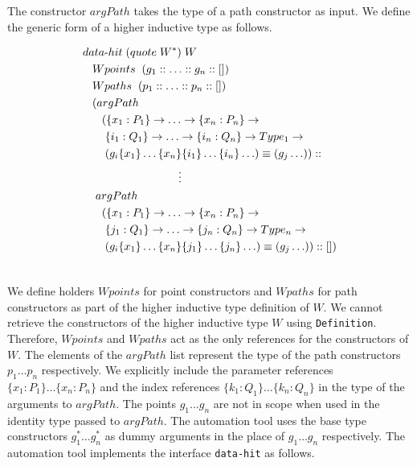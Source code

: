 \documentclass[sigplan,10pt]{acmart}
\begin{document}
The constructor $argPath$ takes the type of a path constructor as input. We define the generic form of a higher inductive type as follows.
\begin{center}
\begingroup
\fontsize{7.9pt}{0pt}\selectfont
\begin{align}
& data{\text -}hit \hspace {0.1cm} (quote \hspace {0.1cm} W^*) \hspace {0.1cm} W \nonumber \\
  & \hspace {0.3cm} Wpoints \hspace {0.2cm} (g_1 ::  \ldots :: g_n :: []) \nonumber \\
  & \hspace {0.3cm} Wpaths  \hspace {0.2cm} (p_1 :: \ldots :: p_n :: []) \nonumber \\
  & \hspace {0.3cm} (argPath \nonumber \\
  & \hspace {0.6cm} (\{x_1:P_1\} \rightarrow \ldots \rightarrow \{x_n:P_n\} \rightarrow \nonumber \\
  & \hspace {0.7cm} \{i_1:Q_1\} \rightarrow \ldots \rightarrow \{i_n:Q_n\} \rightarrow Type_1 \rightarrow \nonumber \\
  & \hspace {0.7cm} (g_i \{x_1\} \ldots \{x_n\} \{i_1\} \ldots \{i_n\} \ldots) \equiv (g_j \ldots)) :: \nonumber \\
  & \hspace {3cm} \vdots \nonumber \\
  & \hspace {0.4cm} argPath \nonumber \\
  & \hspace {0.6cm} (\{x_1:P_1\} \rightarrow \ldots \rightarrow \{x_n:P_n\} \rightarrow \nonumber \\
  & \hspace {0.7cm} \{j_1:Q_1\} \rightarrow \ldots \rightarrow \{j_n:Q_n\} \rightarrow Type_n \rightarrow \nonumber \\
  & \hspace {0.7cm} (g_i \{x_1\} \ldots \{x_n\} \{j_1\} \ldots \{j_n\} \ldots) \equiv (g_j \ldots)) :: [])\nonumber \\ \nonumber
\end{align}
\endgroup
\end{center}
\normalsize

We define holders $Wpoints$ for point constructors and $Wpaths$ for path constructors as part of the higher inductive type definition of $W$. We cannot retrieve the constructors of the higher inductive type $W$ using {\tt Definition}. Therefore, $Wpoints$ and $Wpaths$ act as the only references for the constructors of $W$. The elements of the $argPath$ list represent the type of the path constructors $p_1 \ldots p_n$ respectively. We explicitly include the parameter references $\{x_1 : P_1\} \ldots \{x_n : P_n\}$ and the index references $\{k_1 : Q_1\} \ldots \{k_n : Q_n\}$ in the type of the arguments to $argPath$. The points $g_1 \ldots g_n$ are not in scope when used in the identity type passed to $argPath$. The automation tool uses the base type constructors $g_1^* \ldots g_n^*$ as dummy arguments in the place of $g_1 \ldots g_n$ respectively. The automation tool implements the interface {\tt data-hit} as follows.
\end{document}
